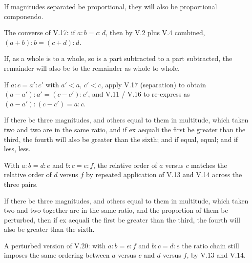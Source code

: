 \documentclass{rrxiv}
\begin{document}
\begin{claim}
\label{prop:V.18}
If magnitudes separated be proportional, they will also be
proportional componendo.
\end{claim}
\begin{evidence}[Proof of V.18]
\label{ev:V.18}
The converse of V.17: if $a : b = c : d$, then by V.2 plus V.4
combined, $(a + b) : b = (c + d) : d$.
\end{evidence}

\begin{claim}
\label{prop:V.19}
If, as a whole is to a whole, so is a part subtracted to a part
subtracted, the remainder will also be to the remainder as whole to
whole.
\end{claim}
\begin{evidence}[Proof of V.19]
\label{ev:V.19}
If $a : c = a' : c'$ with $a' < a$, $c' < c$, apply V.17 (separation)
to obtain $(a - a') : a' = (c - c') : c'$, and V.11 / V.16 to
re-express as $(a - a') : (c - c') = a : c$.
\end{evidence}

\begin{claim}
\label{prop:V.20}
If there be three magnitudes, and others equal to them in multitude,
which taken two and two are in the same ratio, and if ex aequali the
first be greater than the third, the fourth will also be greater than
the sixth; and if equal, equal; and if less, less.
\end{claim}
\begin{evidence}[Proof of V.20]
\label{ev:V.20}
With $a : b = d : e$ and $b : c = e : f$, the relative order of $a$
versus $c$ matches the relative order of $d$ versus $f$ by repeated
application of V.13 and V.14 across the three pairs.
\end{evidence}

\begin{claim}
\label{prop:V.21}
If there be three magnitudes, and others equal to them in multitude,
which taken two and two together are in the same ratio, and the
proportion of them be perturbed, then if ex aequali the first be
greater than the third, the fourth will also be greater than the
sixth.
\end{claim}
\begin{evidence}[Proof of V.21]
\label{ev:V.21}
A perturbed version of V.20: with $a : b = e : f$ and $b : c = d : e$
the ratio chain still imposes the same ordering between $a$ versus
$c$ and $d$ versus $f$, by V.13 and V.14.
\end{evidence}
\end{document}
